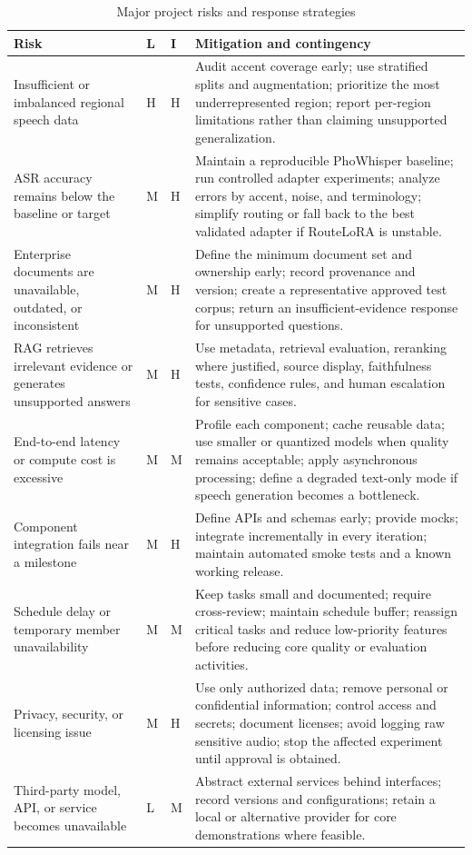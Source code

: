 \documentclass[11pt,a4paper]{article}
\begin{document}
\begin{table}[htbp]
\centering
\caption{Major project risks and response strategies}
\label{tab:risk-register}
\footnotesize
\renewcommand{\arraystretch}{1.2}
\begin{tabularx}{\textwidth}{|p{}|>{\centering\arraybackslash}p{}|>{\centering\arraybackslash}p{}|X|}
\hline
\rowcolor{tableheader}
\textbf{Risk} & \textbf{L} & \textbf{I} & \textbf{Mitigation and contingency} \\
\hline
Insufficient or imbalanced regional speech data & H & H &
Audit accent coverage early; use stratified splits and augmentation; prioritize
the most underrepresented region; report per-region limitations rather than
claiming unsupported generalization. \\
\hline
ASR accuracy remains below the baseline or target & M & H &
Maintain a reproducible PhoWhisper baseline; run controlled adapter experiments;
analyze errors by accent, noise, and terminology; simplify routing or fall back
to the best validated adapter if RouteLoRA is unstable. \\
\hline
Enterprise documents are unavailable, outdated, or inconsistent & M & H &
Define the minimum document set and ownership early; record provenance and
version; create a representative approved test corpus; return an
insufficient-evidence response for unsupported questions. \\
\hline
RAG retrieves irrelevant evidence or generates unsupported answers & M & H &
Use metadata, retrieval evaluation, reranking where justified, source display,
faithfulness tests, confidence rules, and human escalation for sensitive cases. \\
\hline
End-to-end latency or compute cost is excessive & M & M &
Profile each component; cache reusable data; use smaller or quantized models
when quality remains acceptable; apply asynchronous processing; define a
degraded text-only mode if speech generation becomes a bottleneck. \\
\hline
Component integration fails near a milestone & M & H &
Define APIs and schemas early; provide mocks; integrate incrementally in every
iteration; maintain automated smoke tests and a known working release. \\
\hline
Schedule delay or temporary member unavailability & M & M &
Keep tasks small and documented; require cross-review; maintain schedule buffer;
reassign critical tasks and reduce low-priority features before reducing core
quality or evaluation activities. \\
\hline
Privacy, security, or licensing issue & M & H &
Use only authorized data; remove personal or confidential information; control
access and secrets; document licenses; avoid logging raw sensitive audio; stop
the affected experiment until approval is obtained. \\
\hline
Third-party model, API, or service becomes unavailable & L & M &
Abstract external services behind interfaces; record versions and
configurations; retain a local or alternative provider for core demonstrations
where feasible. \\
\hline
\end{tabularx}
\end{table}
\end{document}

